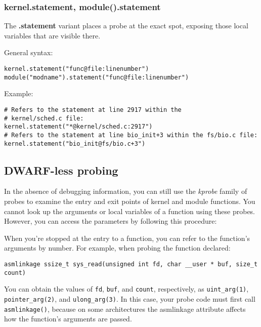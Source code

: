 \documentclass[twoside,english]{article}
\newenvironment{vindent}
{\begin{list}{}{\setlength{\listparindent}{6pt}}
\item[]}
{\end{list}}
\begin{document}
\subsubsection{kernel.statement, module().statement}
The \textbf{.statement} variant places a probe at the exact spot, exposing those local
variables that are visible there.

General syntax:

\begin{vindent}
\begin{verbatim}
kernel.statement("func@file:linenumber")
module("modname").statement("func@file:linenumber")
\end{verbatim}
\end{vindent}
Example:

\begin{vindent}
\begin{verbatim}
# Refers to the statement at line 2917 within the
# kernel/sched.c file:
kernel.statement("*@kernel/sched.c:2917")
# Refers to the statement at line bio_init+3 within the fs/bio.c file:
kernel.statement("bio_init@fs/bio.c+3")
\end{verbatim}
\end{vindent}


\subsection{DWARF-less probing}

In the absence of debugging information, you can still use the
\emph{kprobe} family of probes to examine the entry and exit points of
kernel and module functions. You cannot look up the arguments or local
variables of a function using these probes. However, you can access
the parameters by following this procedure:

When you're stopped at the entry to a function, you can refer to the
function's arguments by number. For example, when probing the function
declared:

\begin{vindent}
\begin{verbatim}
asmlinkage ssize_t sys_read(unsigned int fd, char __user * buf, size_t
count)
\end{verbatim}
\end{vindent}

You can obtain the values of \texttt{fd}, \texttt{buf}, and
\texttt{count}, respectively, as \texttt{uint\_arg(1)},
\texttt{pointer\_arg(2)}, and \texttt{ulong\_arg(3)}. In this case, your
probe code must first call \texttt{asmlinkage()}, because on some
architectures the asmlinkage attribute affects how the function's
arguments are passed.
\end{document}
